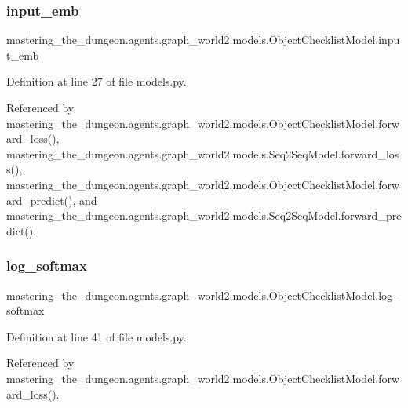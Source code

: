 \subsubsection{\texorpdfstring{input\+\_\+emb}{input\_emb}}
{\footnotesize\ttfamily mastering\+\_\+the\+\_\+dungeon.\+agents.\+graph\+\_\+world2.\+models.\+Object\+Checklist\+Model.\+input\+\_\+emb}



Definition at line 27 of file models.\+py.



Referenced by mastering\+\_\+the\+\_\+dungeon.\+agents.\+graph\+\_\+world2.\+models.\+Object\+Checklist\+Model.\+forward\+\_\+loss(), mastering\+\_\+the\+\_\+dungeon.\+agents.\+graph\+\_\+world2.\+models.\+Seq2\+Seq\+Model.\+forward\+\_\+loss(), mastering\+\_\+the\+\_\+dungeon.\+agents.\+graph\+\_\+world2.\+models.\+Object\+Checklist\+Model.\+forward\+\_\+predict(), and mastering\+\_\+the\+\_\+dungeon.\+agents.\+graph\+\_\+world2.\+models.\+Seq2\+Seq\+Model.\+forward\+\_\+predict().

\mbox{\label{classmastering__the__dungeon_1_1agents_1_1graph__world2_1_1models_1_1ObjectChecklistModel_a6a759ef028b4aed5d2ed0097d5c0569f}} 
\subsubsection{\texorpdfstring{log\+\_\+softmax}{log\_softmax}}
{\footnotesize\ttfamily mastering\+\_\+the\+\_\+dungeon.\+agents.\+graph\+\_\+world2.\+models.\+Object\+Checklist\+Model.\+log\+\_\+softmax}



Definition at line 41 of file models.\+py.



Referenced by mastering\+\_\+the\+\_\+dungeon.\+agents.\+graph\+\_\+world2.\+models.\+Object\+Checklist\+Model.\+forward\+\_\+loss().

